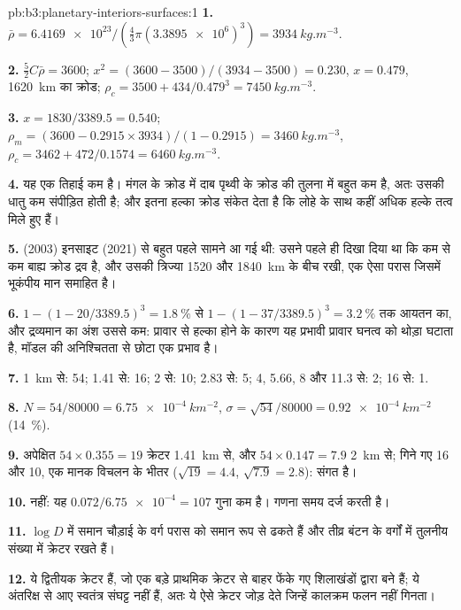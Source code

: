 \begin{solution}{pb:b3:planetary-interiors-surfaces:1}
\textbf{1.} $\bar\rho = \num{6.4169e23}/(\tfrac43\pi(\num{3.3895e6})^3) =
\qty{3934}{kg.m^{-3}}$.

\textbf{2.} $\tfrac52C\bar\rho = 3600$; $x^2 = (3600 - 3500)/(3934 - 3500) =
0.230$, $x = 0.479$, \qty{1620}{km} का क्रोड; $\rho_c = 3500 +
434/0.479^3 = \qty{7450}{kg.m^{-3}}$.

\textbf{3.} $x = 1830/3389.5 = 0.540$; $\rho_m = (3600 - 0.2915\times
3934)/(1 - 0.2915) = \qty{3460}{kg.m^{-3}}$, $\rho_c = 3462 +
472/0.1574 = \qty{6460}{kg.m^{-3}}$.

\textbf{4.} यह एक तिहाई कम है। मंगल के क्रोड में दाब
पृथ्वी के क्रोड की तुलना में बहुत कम है, अतः उसकी धातु कम संपीड़ित होती है; और इतना हल्का क्रोड
संकेत देता है कि लोहे के साथ कहीं अधिक हल्के तत्व मिले हुए हैं।

\textbf{5.}  (2003) इनसाइट (2021) से बहुत पहले सामने आ गई थी: उसने
पहले ही दिखा दिया था कि कम से कम बाह्य क्रोड द्रव है, और उसकी त्रिज्या
1520 और \qty{1840}{km} के बीच रखी, एक ऐसा परास जिसमें
भूकंपीय मान समाहित है।

\textbf{6.} $1 - (1 - 20/3389.5)^3 = \qty{1.8}{\percent}$ से $1 - (1 -
37/3389.5)^3 = \qty{3.2}{\percent}$ तक आयतन का, और द्रव्यमान का अंश उससे कम:
प्रावार से हल्का होने के कारण यह प्रभावी प्रावार घनत्व को थोड़ा घटाता है,
मॉडल की अनिश्चितता से छोटा एक प्रभाव है।

\textbf{7.} \qty{1}{km} से: 54; 1.41 से: 16; 2 से: 10; 2.83 से: 5;
4, 5.66, 8 और 11.3 से: 2; 16 से: 1.

\textbf{8.} $N = 54/80000 = \qty{6.75e-4}{km^{-2}}$, $\sigma = \sqrt{54}/80000
= \qty{0.92e-4}{km^{-2}}$ (\qty{14}{\percent}).

\textbf{9.} अपेक्षित $54\times0.355 = 19$ क्रेटर \qty{1.41}{km} से, और
$54\times0.147 = 7.9$ \qty{2}{km} से; गिने गए 16 और 10, एक
मानक विचलन के भीतर ($\sqrt{19} = 4.4$, $\sqrt{7.9} = 2.8$): संगत है।

\textbf{10.} नहीं: यह $0.072/\num{6.75e-4} = 107$ गुना कम है। गणना
समय दर्ज करती है।

\textbf{11.} $\log D$ में समान चौड़ाई के वर्ग परास को समान रूप से ढकते हैं और
तीव्र बंटन के वर्गों में तुलनीय संख्या में क्रेटर रखते हैं।

\textbf{12.} ये द्वितीयक क्रेटर हैं, जो एक बड़े प्राथमिक क्रेटर से
बाहर फेंके गए शिलाखंडों द्वारा बने हैं; ये अंतरिक्ष से आए स्वतंत्र संघट्ट नहीं हैं,
अतः ये ऐसे क्रेटर जोड़ देते जिन्हें कालक्रम फलन नहीं गिनता।


\end{solution}
